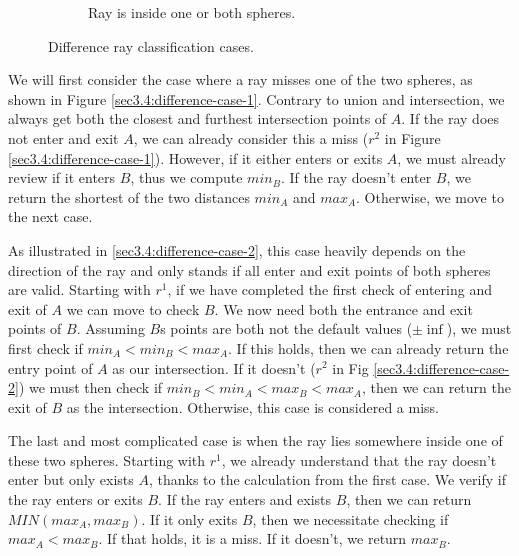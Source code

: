 \documentclass[a4paper,11pt,oneside]{article}
\begin{document}
\begin{figure}[ht]
\begin{subfigure}[b]{0.3\textwidth}
		\caption{Ray is inside one or both spheres.}
		\label{sec3.4:difference-case-3}
	\end{subfigure}
	\caption{Difference ray classification cases.}
	\label{sec3.4:sphere-difference}
\end{figure}


We will first consider the case where a ray misses one of the two spheres, as shown in Figure \ref{sec3.4:difference-case-1}.  
Contrary to union and intersection, we always get both the closest and furthest intersection points of $A$. If the ray does not enter and exit $A$, we can already consider this a miss ($r^2$ in Figure \ref{sec3.4:difference-case-1}). However, if it either enters or exits $A$, we must already review if it enters $B$, thus we compute $min_B$. If the ray doesn't enter $B$, we return the shortest of the two distances $min_A$ and $max_A$. Otherwise, we move to the next case.

As illustrated in \ref{sec3.4:difference-case-2}, this case heavily depends on the direction of the ray and only stands if all enter and exit points of both spheres are valid. Starting with $r^1$, if we have completed the first check of entering and exit of $A$ we can move to check $B$. We now need both the entrance and exit points of $B$. Assuming $B$s points are both not the default values ($\pm\inf$), we must first check if $min_A < min_B < max_A$. If this holds, then we can already return the entry point of $A$ as our intersection. If it doesn't ($r^2$ in Fig \ref{sec3.4:difference-case-2}) we must then check if $min_B < min_A < max_B < max_A$, then we can return the exit of $B$ as the intersection. Otherwise, this case is considered a miss.

The last and most complicated case is when the ray lies somewhere inside one of these two spheres. Starting with $r^1$, we already understand that the ray doesn't enter but only exists $A$, thanks to the calculation from the first case. We verify if the ray enters or exits $B$. If the ray enters and exists $B$, then we can return $MIN(max_{A}, max_{B})$. If it only exits $B$, then we necessitate checking if $max_A < max_B$. If that holds, it is a miss. If it doesn't, we return $max_B$.
\end{document}
